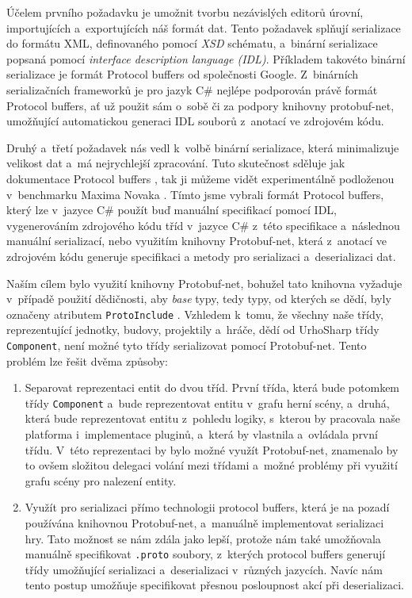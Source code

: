 Účelem prvního požadavku je umožnit tvorbu nezávislých editorů úrovní, importujících a~exportujících náš formát dat. Tento požadavek splňují serializace do formátu XML, definovaného pomocí \textit{XSD} schématu, a~binární serializace popsaná pomocí \textit{interface description language (IDL)}. Příkladem takovéto binární serializace je formát Protocol buffers \citep{site:protobuf} od společnosti Google. Z~binárních serializačních frameworků je pro jazyk C\# nejlépe podporován právě formát Protocol buffers, ať už použit sám o~sobě či za podpory knihovny protobuf-net, umožňující automatickou generaci IDL souborů z~anotací ve zdrojovém kódu. 

Druhý a~třetí požadavek nás vedl k~volbě binární serializace, která minimalizuje velikost dat a~má nejrychlejší zpracování. Tuto skutečnost sděluje jak dokumentace Protocol buffers \citep{site:protobufdevguide}, tak ji můžeme vidět experimentálně podloženou v~benchmarku Maxima Novaka \citep{site:serializationspeed}. Tímto jsme vybrali formát Protocol buffers, který lze v~jazyce C\# použít buď manuální specifikací \textit{ } pomocí IDL, vygenerováním zdrojového kódu tříd v~jazyce C\# z~této specifikace a~následnou manuální serializací, nebo využitím knihovny Protobuf-net, která z~anotací ve zdrojovém kódu generuje specifikaci \textit{ } a  metody pro serializaci a~deserializaci dat.

Naším cílem bylo využití knihovny Protobuf-net, bohužel tato knihovna vyžaduje v~případě použití dědičnosti, aby \textit{base} typy, tedy typy, od kterých se dědí, byly označeny atributem \texttt{ProtoInclude} \citep{site:protobufnet}. Vzhledem k~tomu, že všechny naše třídy, reprezentující jednotky, budovy, projektily a~hráče, dědí od UrhoSharp třídy \texttt{Component}, není možné tyto třídy serializovat pomocí Protobuf-net. Tento problém lze řešit dvěma způsoby: 

\begin{enumerate}
	\item Separovat reprezentaci entit do dvou tříd. První třída, která bude potomkem třídy \texttt{Component} a~bude reprezentovat entitu v~grafu herní scény, a~druhá, která bude reprezentovat entitu z~pohledu logiky, s~kterou by pracovala naše platforma i~implementace pluginů, a~která by vlastnila a~ovládala první třídu. V~této reprezentaci by bylo možné využít Protobuf-net, znamenalo by to ovšem složitou delegaci volání mezi třídami a~možné problémy při využití grafu scény pro nalezení entity. 
	\item Využít pro serializaci přímo technologii protocol buffers, která je na pozadí používána knihovnou Protobuf-net, a~manuálně implementovat serializaci hry. Tato možnost se nám zdála jako lepší, protože nám také umožňovala manuálně specifikovat \texttt{.proto} soubory, z~kterých protocol buffers generují třídy umožňující serializaci a~deserializaci v~různých jazycích. Navíc nám tento postup umožňuje specifikovat přesnou posloupnost akcí při deserializaci.
\end{enumerate}

